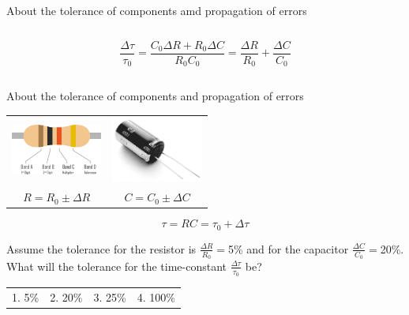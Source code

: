 \documentclass[presentation,aspectratio=169]{beamer}
\begin{document}
\begin{frame}[label={sec:org6db2167}]{About the tolerance of components amd propagation of errors}
\begin{columns}
\begin{column}{0.7\columnwidth}
\small
\pause
\[\frac{\Delta\tau}{\tau_0} = \frac{C_0\Delta R + R_0\Delta C}{R_0C_0} = \frac{\Delta R}{R_0} + \frac{\Delta C}{C_0}\]
\end{column}
\end{columns}
\end{frame}

\begin{frame}[label={sec:orgd445274}]{About the tolerance of components and propagation of errors}
\setlength{\tabcolsep}{1cm}

\begin{center}
\begin{tabular}{cc}
\includegraphics[width=3cm]{../../figures/resistor-color-code-4-band.png} & \includegraphics[width=3cm]{../../figures/capacitor.jpg}\\
\(R = R_0 \pm \Delta R\) & \(C = C_0 \pm \Delta C\)\\
\end{tabular}
\end{center}

\[\tau = RC = \tau_0 + \Delta\tau\]

\pause
Assume the tolerance for the resistor is \(\frac{\Delta R}{R_0}=\)5\% and for the capacitor \(\frac{\Delta C}{C_0}=\)20\%. What will the tolerance for the time-constant \(\frac{\Delta\tau}{\tau_0}\) be?
\setlength{\tabcolsep}{1cm}
\begin{center}
\begin{tabular}{cccc}
1. 5\% & 2. 20\% & 3. 25\% & 4. 100\%\\
\end{tabular}
\end{center}
\end{frame}
\end{document}

